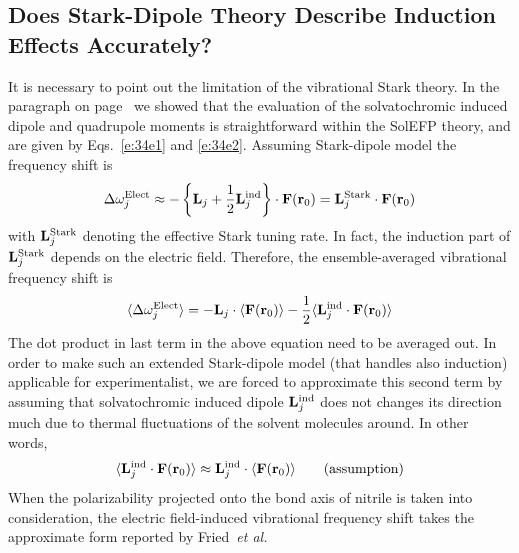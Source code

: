 \documentclass[b5paper,oneside,fleqn,11pt]{book}
\begin{document}
\begin{refsection}
\subsection{Does Stark-Dipole Theory Describe Induction Effects Accurately?\label{s:stark-dipole-cn}}

It is necessary to point out the limitation of the
vibrational Stark theory. 
In the paragraph on page~\pageref{p:solindmult} we showed that the
evaluation of the solvatochromic induced dipole and quadrupole moments is
straightforward within the SolEFP theory, and are given by Eqs.~\eqref{e:34e1} and \eqref{e:34e2}.
Assuming Stark\hyp{}dipole model the frequency shift
is
%
\begin{equation} \label{e:dmtp-solmmm-dipole}
 \Delta\omega_j^{\rm Elect} \approx  -
                       \left\{ {\bf L}_j + \frac{1}{2} {\bf L}_j^{\rm ind} \right\} 
                       \cdot {\bf F}({\bf r}_0) = {\bf L}_j^{\rm Stark} \cdot {\bf F}({\bf r}_0)
\end{equation}
%
with ${\bf L}_j^{\rm Stark}$ denoting the effective Stark tuning rate.
In fact, the induction part of ${\bf L}_j^{\rm Stark}$ depends on the electric field.
Therefore, the ensemble\hyp{}averaged vibrational frequency shift
is
%
\begin{equation} 
 \langle \Delta\omega_j^{\rm Elect} \rangle =  -
                        {\bf L}_j  \cdot  \langle  {\bf F}({\bf r}_0) \rangle 
                     - \frac{1}{2} \langle {\bf L}_j^{\rm ind}  \cdot {\bf F}({\bf r}_0) \rangle
\end{equation}
%
The dot product in last term in the above equation need to be averaged out.
In order to make such an extended Stark\hyp{}dipole model (that handles also induction)
applicable for experimentalist, we are forced to approximate this second term
by assuming that solvatochromic induced dipole ${\bf L}_j^{\rm ind}$ does not
changes its direction much due to thermal fluctuations of the solvent molecules around.
In other words,
%
\begin{equation} \label{e:dmtp-solmmm-dipole-assumption} 
\langle {\bf L}_j^{\rm ind}  \cdot {\bf F}({\bf r}_0) \rangle \approx 
{\bf L}_j^{\rm ind} \cdot  \langle  {\bf F}({\bf r}_0) \rangle 
\qquad \text{(assumption)}
\end{equation}
%
When the polarizability projected onto
the bond axis of nitrile is taken into consideration,
the electric field\hyp{}induced vibrational frequency
shift takes the approximate form reported by 
Fried~\emph{et al.} \citep{Fried.Wang.Boxer.Ren.Pande.JPCB.2013}

\end{refsection}
\end{document}
